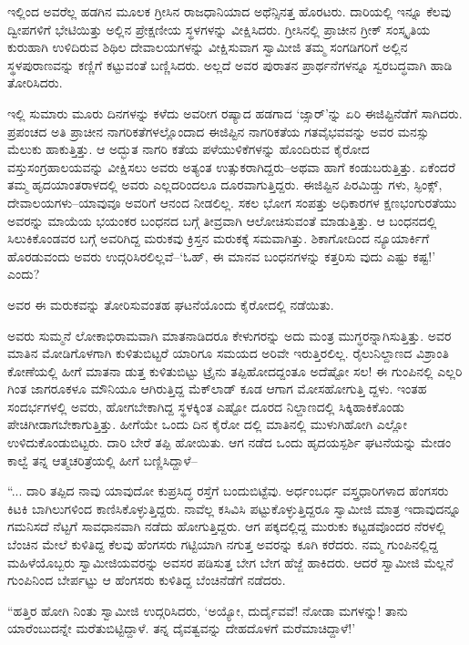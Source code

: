 ಇಲ್ಲಿಂದ ಅವರೆಲ್ಲ ಹಡಗಿನ ಮೂಲಕ ಗ್ರೀಸಿನ ರಾಜಧಾನಿಯಾದ ಅಥೆನ್ಸಿನತ್ತ ಹೊರಟರು. ದಾರಿಯಲ್ಲಿ ಇನ್ನೂ ಕೆಲವು ದ್ವೀಪಗಳಿಗೆ ಭೇಟಿಯಿತ್ತು ಅಲ್ಲಿನ ಪ್ರೇಕ್ಷಣೀಯ ಸ್ಥಳಗಳನ್ನು ವೀಕ್ಷಿಸಿದರು. ಗ್ರೀಸಿನಲ್ಲಿ ಪ್ರಾಚೀನ ಗ್ರೀಕ್ ಸಂಸ್ಕೃತಿಯ ಕುರುಹಾಗಿ ಉಳಿದಿರುವ ಶಿಥಿಲ ದೇವಾಲಯಗಳನ್ನು ವೀಕ್ಷಿಸುವಾಗ ಸ್ವಾಮೀಜಿ ತಮ್ಮ ಸಂಗಡಿಗರಿಗೆ ಅಲ್ಲಿನ ಸ್ಥಳಪುರಾಣವನ್ನು ಕಣ್ಣಿಗೆ ಕಟ್ಟುವಂತೆ ಬಣ್ಣಿಸಿದರು. ಅಲ್ಲದೆ ಅವರ ಪುರಾತನ ಪ್ರಾರ್ಥನೆಗಳನ್ನೂ ಸ್ವರಬದ್ಧವಾಗಿ ಹಾಡಿ ತೋರಿಸಿದರು.

ಇಲ್ಲಿ ಸುಮಾರು ಮೂರು ದಿನಗಳನ್ನು ಕಳೆದು ಅವರೀಗ ರಷ್ಯಾದ ಹಡಗಾದ ‘ಜ್ಸಾರ್​’ನ್ನು ಏರಿ ಈಜಿಪ್ಟಿನೆಡೆಗೆ ಸಾಗಿದರು. ಪ್ರಪಂಚದ ಅತಿ ಪ್ರಾಚೀನ ನಾಗರಿಕತೆಗಳಲ್ಲೊಂದಾದ ಈಜಿಪ್ಟಿನ ನಾಗರಿಕತೆಯ ಗತವೈಭವವನ್ನು ಅವರ ಮನಸ್ಸು ಮೆಲುಕು ಹಾಕುತ್ತಿತ್ತು. ಆ ಅದ್ಭುತ ನಾಗರಿ ಕತೆಯ ಪಳೆಯುಳಿಕೆಗಳನ್ನು ಹೊಂದಿರುವ ಕೈರೋದ ವಸ್ತುಸಂಗ್ರಹಾಲಯವನ್ನು ವೀಕ್ಷಿಸಲು ಅವರು ಅತ್ಯಂತ ಉತ್ಸುಕರಾಗಿದ್ದರು–ಅಥವಾ ಹಾಗೆ ಕಂಡುಬರುತ್ತಿತ್ತು. ಏಕೆಂದರೆ ತಮ್ಮ ಹೃದಯಾಂತರಾಳದಲ್ಲಿ ಅವರು ಎಲ್ಲದರಿಂದಲೂ ದೂರವಾಗುತ್ತಿದ್ದರು. ಈಜಿಪ್ಟಿನ ಪಿರಮಿಡ್ಡು ಗಳು, ಸ್ಫಿಂಕ್ಸ್, ದೇವಾಲಯಗಳು–ಯಾವುವೂ ಅವರಿಗೆ ಆನಂದ ನೀಡಲಿಲ್ಲ. ಸಕಲ ಭೋಗ ಸಂಪತ್ತು ಅಧಿಕಾರಗಳ ಕ್ಷಣಭಂಗುರತೆಯು ಅವರನ್ನು ಮಾಯೆಯ ಭಯಂಕರ ಬಂಧನದ ಬಗ್ಗೆ ತೀವ್ರವಾಗಿ ಆಲೋಚಿಸುವಂತೆ ಮಾಡುತ್ತಿತ್ತು. ಆ ಬಂಧನದಲ್ಲಿ ಸಿಲುಕಿಕೊಂಡವರ ಬಗ್ಗೆ ಅವರಿಗಿದ್ದ ಮರುಕವು ಕ್ರಿಸ್ತನ ಮರುಕಕ್ಕೆ ಸಮವಾಗಿತ್ತು. ಶಿಕಾಗೋದಿಂದ ನ್ಯೂಯಾರ್ಕಿಗೆ ಹೊರಡುವಂದು ಅವರು ಉದ್ಗರಿಸಿರಲಿಲ್ಲವೆ–‘ಓಹ್, ಈ ಮಾನವ ಬಂಧನಗಳನ್ನು ಕತ್ತರಿಸು ವುದು ಎಷ್ಟು ಕಷ್ಟ!’ ಎಂದು?

ಅವರ ಈ ಮರುಕವನ್ನು ತೋರಿಸುವಂತಹ ಘಟನೆಯೊಂದು ಕೈರೋದಲ್ಲಿ ನಡೆಯಿತು.

ಅವರು ಸುಮ್ಮನೆ ಲೋಕಾಭಿರಾಮವಾಗಿ ಮಾತನಾಡಿದರೂ ಕೇಳುಗರನ್ನು ಅದು ಮಂತ್ರ ಮುಗ್ಧರನ್ನಾಗಿಸುತ್ತಿತ್ತು. ಅವರ ಮಾತಿನ ಮೋಡಿಗೊಳಗಾಗಿ ಕುಳಿತುಬಿಟ್ಟರೆ ಯಾರಿಗೂ ಸಮಯದ ಅರಿವೇ ಇರುತ್ತಿರಲಿಲ್ಲ. ರೈಲುನಿಲ್ದಾಣದ ವಿಶ್ರಾಂತಿ ಕೋಣೆಯಲ್ಲಿ ಹೀಗೆ ಮಾತನಾ ಡುತ್ತ ಕುಳಿತುಬಿಟ್ಟು ಟ್ರೈನು ತಪ್ಪಿಹೋದದ್ದಂತೂ ಅದೆಷ್ಟೋ ಸಲ! ಈ ಗುಂಪಿನಲ್ಲಿ ಎಲ್ಲರಿ ಗಿಂತ ಜಾಗರೂಕಳೂ ಮೌನಿಯೂ ಆಗಿರುತ್ತಿದ್ದ ಮೆಕ್​ಲಾಡ್ ಕೂಡ ಆಗಾಗ ಮೋಸಹೋಗುತ್ತಿ ದ್ದಳು. ಇಂತಹ ಸಂದರ್ಭಗಳಲ್ಲಿ ಅವರು, ಹೋಗಬೇಕಾಗಿದ್ದ ಸ್ಥಳಕ್ಕಿಂತ ಎಷ್ಟೋ ದೂರದ ನಿಲ್ದಾಣದಲ್ಲಿ ಸಿಕ್ಕಿಹಾಕಿಕೊಂಡು ಪೇಚಿಗೀಡಾಗಬೇಕಾಗುತ್ತಿತ್ತು. ಹೀಗೆಯೇ ಒಂದು ದಿನ ಕೈರೋ ದಲ್ಲಿ ಮಾತಿನಲ್ಲಿ ಮುಳುಗಿಹೋಗಿ ಎಲ್ಲೋ ಉಳಿದುಕೊಂಡುಬಿಟ್ಟರು. ದಾರಿ ಬೇರೆ ತಪ್ಪಿ ಹೋಯಿತು. ಆಗ ನಡೆದ ಒಂದು ಹೃದಯಸ್ಪರ್ಶಿ ಘಟನೆಯನ್ನು ಮೇಡಂ ಕಾಲ್ವೆ ತನ್ನ ಆತ್ಮಚರಿತ್ರೆಯಲ್ಲಿ ಹೀಗೆ ಬಣ್ಣಿಸಿದ್ದಾಳೆ–

“... ದಾರಿ ತಪ್ಪಿದ ನಾವು ಯಾವುದೋ ಕುಪ್ರಸಿದ್ಧ ರಸ್ತೆಗೆ ಬಂದುಬಿಟ್ಟೆವು. ಅರ್ಧಂಬರ್ಧ ವಸ್ತ್ರಧಾರಿಗಳಾದ ಹೆಂಗಸರು ಕಿಟಕಿ ಬಾಗಿಲುಗಳಿಂದ ಕಾಣಿಸಿಕೊಳ್ಳುತ್ತಿದ್ದರು. ನಾವೆಲ್ಲ ಕಸಿವಿಸಿ ಪಟ್ಟುಕೊಳ್ಳುತ್ತಿದ್ದರೂ ಸ್ವಾಮೀಜಿ ಮಾತ್ರ ಇದಾವುದನ್ನೂ ಗಮನಿಸದೆ ನೆಟ್ಟಗೆ ಸಾವಧಾನವಾಗಿ ನಡೆದು ಹೋಗುತ್ತಿದ್ದರು. ಆಗ ಪಕ್ಕದಲ್ಲಿದ್ದ ಮುರುಕು ಕಟ್ಟಡವೊಂದರ ನೆರಳಲ್ಲಿ ಬೆಂಚಿನ ಮೇಲೆ ಕುಳಿತಿದ್ದ ಕೆಲವು ಹೆಂಗಸರು ಗಟ್ಟಿಯಾಗಿ ನಗುತ್ತ ಅವರನ್ನು ಕೂಗಿ ಕರೆದರು. ನಮ್ಮ ಗುಂಪಿನಲ್ಲಿದ್ದ ಮಹಿಳೆಯೊಬ್ಬರು ಸ್ವಾಮೀಜಿಯವರನ್ನು ಅವಸರ ಪಡಿಸುತ್ತ ಬೇಗ ಬೇಗ ಹೆಜ್ಜೆ ಹಾಕಿದರು. ಆದರೆ ಸ್ವಾಮೀಜಿ ಮೆಲ್ಲನೆ ಗುಂಪಿನಿಂದ ಬೇರ್ಪಟ್ಟು ಆ ಹೆಂಗಸರು ಕುಳಿತಿದ್ದ ಬೆಂಚಿನೆಡೆಗೆ ನಡೆದರು.

“ಹತ್ತಿರ ಹೋಗಿ ನಿಂತು ಸ್ವಾಮೀಜಿ ಉದ್ಗರಿಸಿದರು, ‘ಅಯ್ಯೋ, ದುರ್ದೈವವೆ! ನೋಡಾ ಮಗಳನ್ನು! ತಾನು ಯಾರೆಂಬುದನ್ನೇ ಮರೆತುಬಿಟ್ಟಿದ್ದಾಳೆ. ತನ್ನ ದೈವತ್ವವನ್ನು ದೇಹದೊಳಗೆ ಮರೆಮಾಚಿದ್ದಾಳೆ!’

